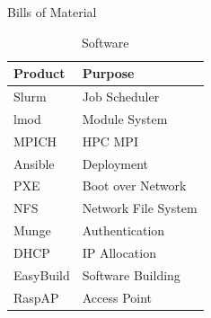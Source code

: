 \documentclass[final]{beamer}
\newlength{\sepwidth}
\newlength{\colwidth}
\newcommand{\separatorcolumn}{\begin{column}{\sepwidth}\end{column}}
\begin{document}
\begin{frame}[t]
\begin{columns}[t]
\begin{column}{\colwidth}
				\begin{block}{Bills of Material}
					\begin{table}

						\parbox{.45\linewidth}{
							\centering
							\caption{Software}				
							\begin{tabular}{l|l}
								\textbf{Product} & {Purpose}\\
								\hline
								Slurm & Job Scheduler \\
								lmod & Module System \\
								MPICH & HPC MPI \\
								Ansible & Deployment \\
								PXE & Boot over Network \\
								NFS & Network File System \\
								Munge & Authentication \\
								DHCP & IP Allocation \\
								EasyBuild & Software Building \\
								RaspAP & Access Point \\
							\end{tabular}
						}
					\end{table}
				\end{block}	
			\end{column}			
			\separatorcolumn
		\end{columns}
	\end{frame}
	
\end{document}
